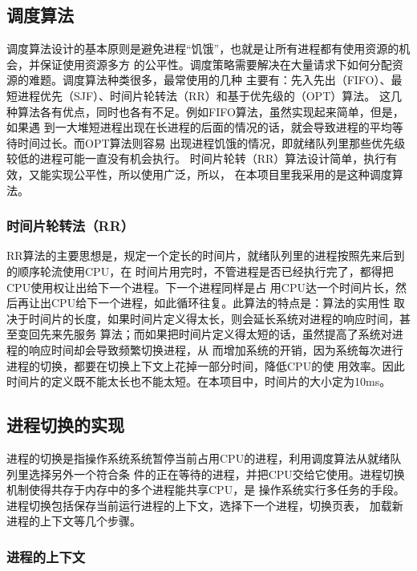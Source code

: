 \documentclass{swfuthesism}
\begin{document}
\subsection{调度算法}

调度算法设计的基本原则是避免进程“饥饿”，也就是让所有进程都有使用资源的机会，并保证使用资源多方
的公平性。调度策略需要解决在大量请求下如何分配资源的难题。调度算法种类很多，最常使用的几种
主要有：先入先出（FIFO）、最短进程优先（SJF）、时间片轮转法（RR）和基于优先级的（OPT）算法。
这几种算法各有优点，同时也各有不足。例如FIFO算法，虽然实现起来简单，但是，如果遇
到一大堆短进程出现在长进程的后面的情况的话，就会导致进程的平均等待时间过长。而OPT算法则容易
出现进程饥饿的情况，即就绪队列里那些优先级较低的进程可能一直没有机会执行。%
时间片轮转（RR）算法设计简单，执行有效，又能实现公平性，所以使用广泛，所以，
在本项目里我采用的是这种调度算法。

\subsubsection{时间片轮转法（RR）}

RR算法的主要思想是，规定一个定长的时间片，就绪队列里的进程按照先来后到的顺序轮流使用CPU，在
时间片用完时，不管进程是否已经执行完了，都得把CPU使用权让出给下一个进程。下一个进程同样是占
用CPU达一个时间片长，然后再让出CPU给下一个进程，如此循环往复。此算法的特点是：算法的实用性
取决于时间片的长度，如果时间片定义得太长，则会延长系统对进程的响应时间，甚至变回先来先服务
算法；而如果把时间片定义得太短的话，虽然提高了系统对进程的响应时间却会导致频繁切换进程，从
而增加系统的开销，因为系统每次进行进程的切换，都要在切换上下文上花掉一部分时间，降低CPU的使
用效率。因此时间片的定义既不能太长也不能太短。在本项目中，时间片的大小定为10ms。

\subsection{进程切换的实现}

进程的切换是指操作系统系统暂停当前占用CPU的进程，利用调度算法从就绪队列里选择另外一个符合条
件的正在等待的进程，并把CPU交给它使用。进程切换机制使得共存于内存中的多个进程能共享CPU，是
操作系统实行多任务的手段。进程切换包括保存当前运行进程的上下文，选择下一个进程，切换页表，
加载新进程的上下文等几个步骤。

\subsubsection{进程的上下文}
\end{document}

